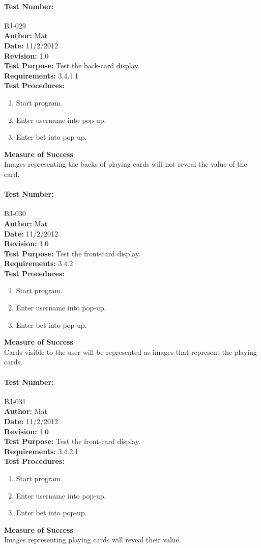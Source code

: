 \documentclass{article}
\begin{document}
\paragraph{Test Number:} BJ-029\\
\textbf{Author:} Mat\\
\textbf{Date:} 11/2/2012\\
\textbf{Revision:} 1.0\\
\textbf{Test Purpose:} Test the back-card display.\\
\textbf{Requirements:} 3.4.1.1 \\
\textbf{Test Procedures:} 
\begin{enumerate}
\item Start program.
\item Enter username into pop-up.
\item Enter bet into pop-up.
\end{enumerate}
\textbf{Measure of Success}\\Images representing the backs of playing cards will not reveal the value of the card.
\paragraph{Test Number:} BJ-030\\
\textbf{Author:} Mat\\
\textbf{Date:} 11/2/2012\\
\textbf{Revision:} 1.0\\
\textbf{Test Purpose:} Test the front-card display.\\
\textbf{Requirements:} 3.4.2 \\
\textbf{Test Procedures:} 
\begin{enumerate}
\item Start program.
\item Enter username into pop-up.
\item Enter bet into pop-up.
\end{enumerate}
\textbf{Measure of Success}\\Cards visible to the user will be represented as images that represent the playing cards.
\paragraph{Test Number:} BJ-031\\
\textbf{Author:} Mat\\
\textbf{Date:} 11/2/2012\\
\textbf{Revision:} 1.0\\
\textbf{Test Purpose:} Test the front-card display.\\
\textbf{Requirements:} 3.4.2.1 \\
\textbf{Test Procedures:} 
\begin{enumerate}
\item Start program.
\item Enter username into pop-up.
\item Enter bet into pop-up.
\end{enumerate}
\textbf{Measure of Success}\\Images representing playing cards will reveal their value.
\end{document}
